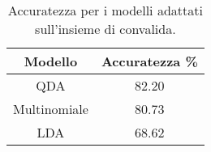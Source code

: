 \begin{table}[H]
\centering
\caption{Accuratezza per i modelli adattati sull'insieme di convalida.}
\begin{tabular}{cc}
\toprule
      Modello &  Accuratezza \% \\
\midrule
          QDA &          82.20 \\
 Multinomiale &          80.73 \\
          LDA &          68.62 \\
\bottomrule
\end{tabular}
\label{tab:acc_pen}
\end{table}